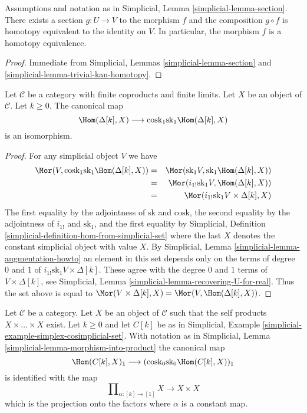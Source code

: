 \begin{lemma}
\label{lemma-equiv}
Assumptions and notation as in
Simplicial, Lemma \ref{simplicial-lemma-section}.
There exists a section $g : U \to V$ to the morphism $f$ and
the composition $g \circ f$ is homotopy equivalent to the identity
on $V$. In particular, the morphism $f$ is a homotopy equivalence.
\end{lemma}

\begin{proof}
Immediate from Simplicial, Lemmas \ref{simplicial-lemma-section} and
\ref{simplicial-lemma-trivial-kan-homotopy}.
\end{proof}

\begin{lemma}
\label{lemma-cosk-hom-deltak}
Let $\mathcal{C}$ be a category with finite coproducts
and finite limits. Let $X$ be an object of $\mathcal{C}$.
Let $k \geq 0$. The canonical map
$$
\Hom(\Delta[k], X)
\longrightarrow
\text{cosk}_1 \text{sk}_1 \Hom(\Delta[k], X)
$$
is an isomorphism.
\end{lemma}

\begin{proof}
For any simplicial object $V$ we have
\begin{eqnarray*}
\Mor(V, \text{cosk}_1 \text{sk}_1 \Hom(\Delta[k], X))
& = &
\Mor(\text{sk}_1 V, \text{sk}_1 \Hom(\Delta[k], X)) \\
& = &
\Mor(i_{1!} \text{sk}_1 V, \Hom(\Delta[k], X)) \\
& = &
\Mor(i_{1!} \text{sk}_1 V \times \Delta[k], X)
\end{eqnarray*}
The first equality by the adjointness of $\text{sk}$ and $\text{cosk}$,
the second equality by the adjointness of $i_{1!}$ and $\text{sk}_1$, and
the first equality by
Simplicial, Definition \ref{simplicial-definition-hom-from-simplicial-set}
where the last $X$ denotes the constant simplicial object with value $X$.
By Simplicial, Lemma \ref{simplicial-lemma-augmentation-howto} an element
in this set depends only on the terms of degree $0$ and $1$
of $i_{1!} \text{sk}_1 V \times \Delta[k]$. These
agree with the degree $0$ and $1$ terms of
$V \times \Delta[k]$, see
Simplicial, Lemma \ref{simplicial-lemma-recovering-U-for-real}.
Thus the set above is equal to
$\Mor(V \times \Delta[k], X) = \Mor(V, \Hom(\Delta[k], X))$.
\end{proof}

\begin{lemma}
\label{lemma-cosk0-hom-deltak}
Let $\mathcal{C}$ be a category. Let $X$ be an object of $\mathcal{C}$
such that the self products $X \times \ldots \times X$ exist.
Let $k \geq 0$ and let $C[k]$ be as in
Simplicial, Example \ref{simplicial-example-simplex-cosimplicial-set}.
With notation as in
Simplicial, Lemma \ref{simplicial-lemma-morphism-into-product}
the canonical map
$$
\Hom(C[k], X)_1
\longrightarrow
(\text{cosk}_0 \text{sk}_0 \Hom(C[k], X))_1
$$
is identified with the map
$$
\prod\nolimits_{\alpha : [k] \to [1]} X
\longrightarrow
X \times X
$$
which is the projection onto the factors where $\alpha$
is a constant map.
\end{lemma}

